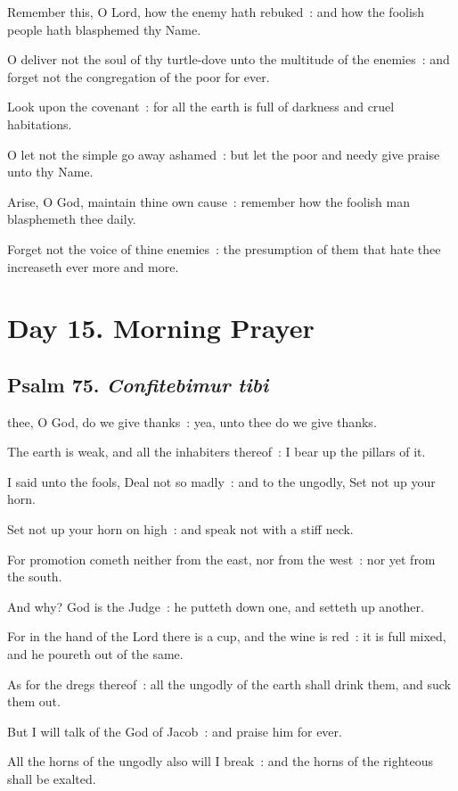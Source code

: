 Remember this, O Lord, how the enemy hath rebuked~: and how the foolish people hath blasphemed thy Name.\par
{}O deliver not the soul of thy turtle-dove unto the multitude of the enemies~: and forget not the congregation of the poor for ever.\par
{}Look upon the covenant~: for all the earth is full of darkness and cruel habitations.\par
{}O let not the simple go away ashamed~: but let the poor and needy give praise unto thy Name.\par
{}Arise, O God, maintain thine own cause~: remember how the foolish man blasphemeth thee daily.\par
{}Forget not the voice of thine enemies~: the presumption of them that hate thee increaseth ever more and more.\par

\section*{Day 15. Morning Prayer}

\subsection{Psalm 75. \textit{Confitebimur tibi}}

 thee, O God, do we give thanks~: yea, unto thee do we give thanks.\par
{}
The earth is weak, and all the inhabiters thereof~: I bear up the pillars of it.\par
{}I said unto the fools, Deal not so madly~: and to the ungodly, Set not up your horn.\par
{}Set not up your horn on high~: and speak not with a stiff neck.\par
{}For promotion cometh neither from the east, nor from the west~: nor yet from the south.\par
{}And why? God is the Judge~: he putteth down one, and setteth up another.\par
{}For in the hand of the Lord there is a cup, and the wine is red~: it is full mixed, and he poureth out of the same.\par
{}As for the dregs thereof~: all the ungodly of the earth shall drink them, and suck them out.\par
{}But I will talk of the God of Jacob~: and praise him for ever.\par
{}All the horns of the ungodly also will I break~: and the horns of the righteous shall be exalted.\par

